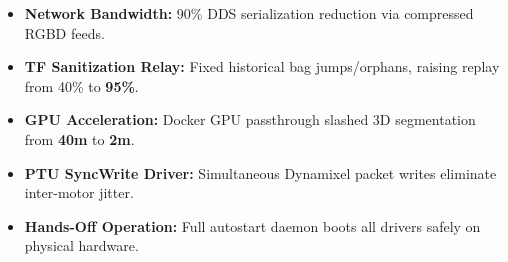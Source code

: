 \documentclass[8pt,a4paper]{article}
\newcommand{\kitem}[2]{{\fontsize{6.8}{7.8}\selectfont\textbf{\color{steelBlue}#1:} #2}}
\begin{document}
\begin{minipage}[t]{0.495\textwidth}
    \vspace{-4pt}

    \begin{tcolorbox}[title={Key Engineering Achievements \& Benchmarks}]
        \begin{itemize}
            \item \kitem{Network Bandwidth}{90\% DDS serialization reduction via compressed RGBD feeds.}
            \item \kitem{TF Sanitization Relay}{Fixed historical bag jumps/orphans, raising replay from 40\% to \textbf{95\%}.}
            \item \kitem{GPU Acceleration}{Docker GPU passthrough slashed 3D segmentation from \textbf{40m} to \textbf{2m}.}
            \item \kitem{PTU SyncWrite Driver}{Simultaneous Dynamixel packet writes eliminate inter-motor jitter.}
            \item \kitem{Hands-Off Operation}{Full autostart daemon boots all drivers safely on physical hardware.}
        \end{itemize}
    \end{tcolorbox}

\end{minipage}

\vspace{-4pt}
\end{document}

